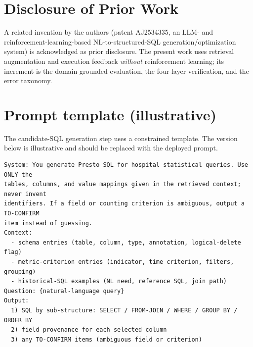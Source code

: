\documentclass[11pt]{article}
\begin{document}
\section*{Disclosure of Prior Work}
A related invention by the authors (patent AJ2534335, an LLM- and reinforcement-learning-based
NL-to-structured-SQL generation/optimization system) is acknowledged as prior disclosure. The
present work uses retrieval augmentation and execution feedback \emph{without} reinforcement
learning; its increment is the domain-grounded evaluation, the four-layer verification, and the
error taxonomy.

\appendix
\section{Prompt template (illustrative)}\label{app:prompt}
The candidate-SQL generation step uses a constrained template. The version below is illustrative and
should be replaced with the deployed prompt.
\begin{verbatim}
System: You generate Presto SQL for hospital statistical queries. Use ONLY the
tables, columns, and value mappings given in the retrieved context; never invent
identifiers. If a field or counting criterion is ambiguous, output a TO-CONFIRM
item instead of guessing.
Context:
  - schema entries (table, column, type, annotation, logical-delete flag)
  - metric-criterion entries (indicator, time criterion, filters, grouping)
  - historical-SQL examples (NL need, reference SQL, join path)
Question: {natural-language query}
Output:
  1) SQL by sub-structure: SELECT / FROM-JOIN / WHERE / GROUP BY / ORDER BY
  2) field provenance for each selected column
  3) any TO-CONFIRM items (ambiguous field or criterion)
\end{verbatim}
\end{document}
